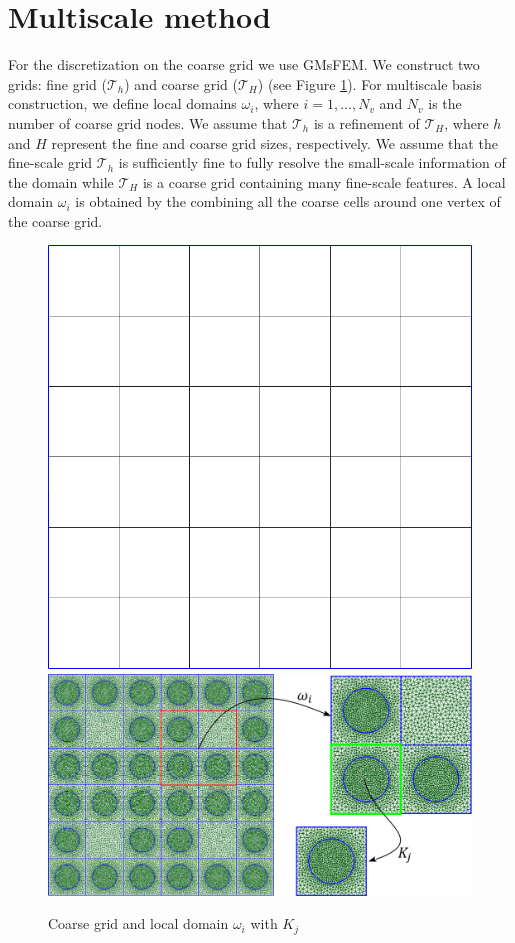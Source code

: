 \documentclass[runningheads]{llncs}
\begin{document}
\section{Multiscale method}
For the discretization on the coarse grid we use GMsFEM.
We construct two grids: fine grid ($\mathcal{T}_h$) and coarse grid ($\mathcal{T}_H$) (see Figure \ref{p1}). 
For multiscale basis construction, we define local domains $\omega_i$, where $i = 1,...,N_v$ and $N_v$ is the number of coarse grid nodes.
We assume that $\mathcal{T}_h$ is a refinement of $\mathcal{T}_H$, where $h$ and $H$ represent the fine and coarse grid sizes, respectively. 
We assume that the fine-scale grid $\mathcal{T}_h$ is sufficiently fine to fully resolve the small-scale information of the domain  while $\mathcal{T}_H$ is a coarse grid containing many fine-scale features.
A local domain $\omega_i$ is obtained by the combining all the coarse cells around one vertex of the coarse grid. 

\begin{figure}[h!]
\centering
\includegraphics[width=0.3\linewidth]{coarse_grid.png}
\hspace{2em}
\includegraphics[width=0.57\linewidth]{omega.png} 
\caption{Coarse grid and local domain $\omega_i$ with $K_j$}
\label{p1}
\end{figure} 

\end{document}
